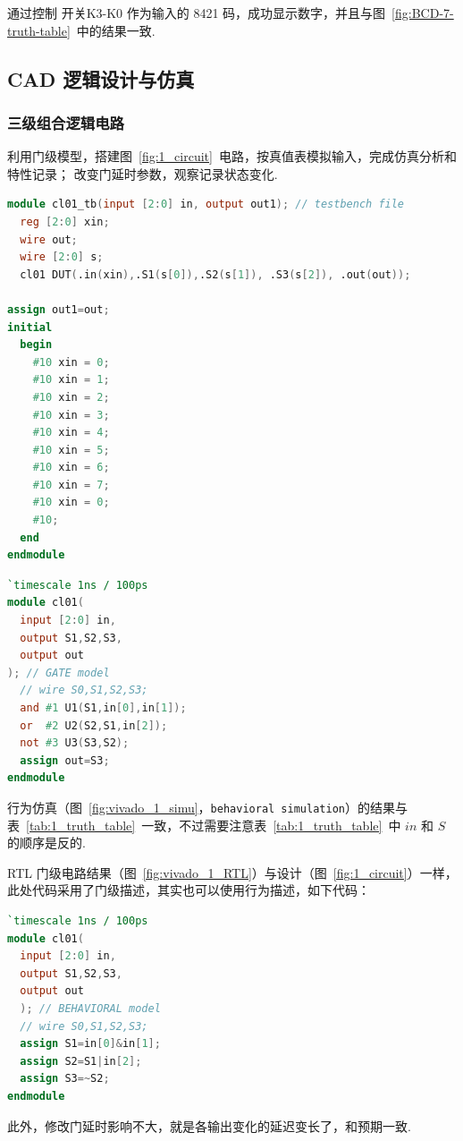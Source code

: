 \documentclass[11pt]{SEU-Digital-Report}
\begin{document}
            \begin{analyze}{}{}
                通过控制 开关K3-K0 作为输入的 8421 码，成功显示数字，并且与图~\ref{fig:BCD-7-truth-table}~中的结果一致.
            \end{analyze}

        \subsection{CAD 逻辑设计与仿真}

            \subsubsection{三级组合逻辑电路}

                利用门级模型，搭建图~\ref{fig:1_circuit}~电路，按真值表模拟输入，完成仿真分析和特性记录；
                改变门延时参数，观察记录状态变化.

                \begin{lstlisting}[language=verilog, title=cl01\_tb.v]
module cl01_tb(input [2:0] in, output out1); // testbench file
  reg [2:0] xin; 
  wire out; 
  wire [2:0] s; 
  cl01 DUT(.in(xin),.S1(s[0]),.S2(s[1]), .S3(s[2]), .out(out)); 

assign out1=out; 
initial 
  begin 
    #10 xin = 0; 
    #10 xin = 1; 
    #10 xin = 2; 
    #10 xin = 3; 
    #10 xin = 4; 
    #10 xin = 5; 
    #10 xin = 6; 
    #10 xin = 7; 
    #10 xin = 0; 
    #10; 
  end
endmodule
                \end{lstlisting}
                \begin{lstlisting}[language=verilog, title=cl01.v]
`timescale 1ns / 100ps 
module cl01( 
  input [2:0] in, 
  output S1,S2,S3, 
  output out 
); // GATE model
  // wire S0,S1,S2,S3; 
  and #1 U1(S1,in[0],in[1]); 
  or  #2 U2(S2,S1,in[2]); 
  not #3 U3(S3,S2); 
  assign out=S3;
endmodule
                \end{lstlisting}

                \begin{analyze}{}{}
                行为仿真（图~\ref{fig:vivado_1_simu}，\texttt{behavioral simulation}）的结果与表~\ref{tab:1_truth_table}~一致，不过需要注意表~\ref{tab:1_truth_table}~中 $in$ 和 $S$ 的顺序是反的.

                RTL 门级电路结果（图~\ref{fig:vivado_1_RTL}）与设计（图~\ref{fig:1_circuit}）一样，此处代码采用了门级描述，其实也可以使用行为描述，如下代码：
                \begin{lstlisting}[language=verilog, title=cl01.v, numbers=none, backgroundcolor=\color{green!3}]
`timescale 1ns / 100ps 
module cl01( 
  input [2:0] in,
  output S1,S2,S3,
  output out
  ); // BEHAVIORAL model
  // wire S0,S1,S2,S3;
  assign S1=in[0]&in[1];
  assign S2=S1|in[2];
  assign S3=~S2;
endmodule
                \end{lstlisting}

                此外，修改门延时影响不大，就是各输出变化的延迟变长了，和预期一致.
            \end{analyze}
\end{document}
